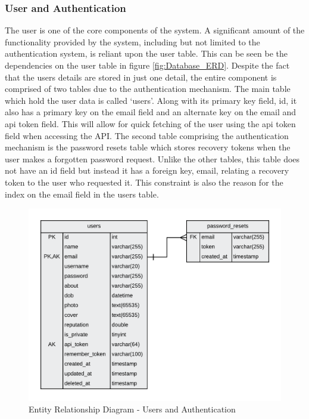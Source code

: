 \subsubsection{User and Authentication}
The user is one of the core components of the system. A significant amount of the functionality provided by the system, including but not limited to the authentication system, is reliant upon the user table. This can be seen be the dependencies on the user table in figure \ref{fig:Database_ERD}. Despite the fact that the users details are stored in just one detail, the entire component is comprised of two tables due to the authentication mechanism. The main table which hold the user data is called `users'. Along with its primary key field, id, it also has a primary key on the email field and an alternate key on the email and api token field. This will allow for quick fetching of the user using the api token field when accessing the API. The second table comprising the authentication mechanism is the password resets table which stores recovery tokens when the user makes a forgotten password request. Unlike the other tables, this table does not have an id field but instead it has a foreign key, email, relating a recovery token to the user who requested it. This constraint is also the reason for the index on the email field in the users table.

\begin{figure}[H]
  \centering
  \includegraphics[width=1.0\textwidth]{Images/Design/Database/Users}
  \caption{Entity Relationship Diagram - Users and Authentication} \label{fig:ERD_Users}
\end{figure}

